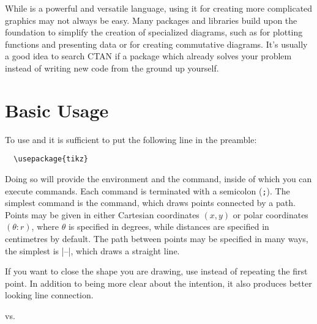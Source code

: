 While \TikZ{} is a powerful and versatile language, using it for creating more
complicated graphics may not always be easy. Many packages and libraries build
upon the  foundation to simplify the creation of specialized diagrams,
such as  for plotting functions and presenting data or
 for creating commutative diagrams. It's usually a
good idea to search CTAN if a package which already solves your problem
instead of writing new \TikZ{} code from the ground up yourself.

\section{Basic Usage}

To use  and \TikZ{} it is sufficient to put the following line in the
preamble:
\begin{verbatim}
  \usepackage{tikz}
\end{verbatim}
Doing so will provide the  environment and the 
command, inside of which you can execute \TikZ{} commands. Each \TikZ{} command
is terminated with a semicolon (\verb|;|). The simplest command is the
 command, which draws points connected by a path. Points may be given
in either Cartesian coordinates \((x, y)\) or polar coordinates
\((\theta\mathpunct{:} r)\), where \(\theta\) is specified in degrees, while
distances are specified in centimetres by default. The path
between points may be specified in many ways, the simplest is
\ltx|--|, which draws a straight line.
\begin{example}
\end{example}
If you want to close the shape you are drawing, use  instead of
repeating the first point. In addition to being more clear about the intention,
it also produces better looking line connection.
\begin{example}[vertical_mode, examplewidth=0.75\linewidth]
vs.\ 
\end{example}

